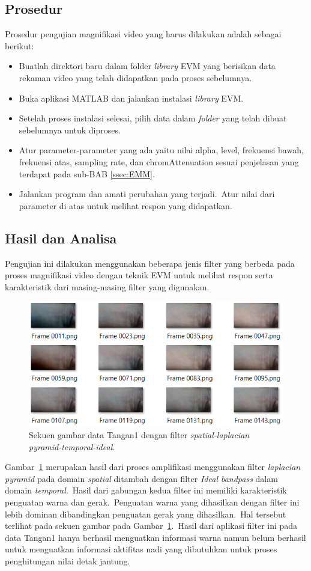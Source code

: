 \subsection{Prosedur}
Prosedur pengujian magnifikasi video yang harus dilakukan adalah sebagai berikut:
\begin{itemize}
\item Buatlah direktori baru dalam folder \textit{library} EVM yang berisikan data rekaman video yang telah didapatkan pada proses sebelumnya.
\item Buka aplikasi MATLAB dan jalankan instalasi \textit{library} EVM.~
\item Setelah proses instalasi selesai, pilih data dalam \textit{folder} yang telah dibuat sebelumnya untuk diproses.
\item Atur parameter-parameter yang ada yaitu nilai alpha, level, frekuensi bawah, frekuensi atas, sampling rate, dan chromAttenuation sesuai penjelasan yang terdapat pada sub-BAB \ref{ssec:EMM}.~
\item Jalankan program dan amati perubahan yang terjadi.~Atur nilai dari parameter di atas untuk melihat respon yang didapatkan.
\end{itemize}

\subsection{Hasil dan Analisa}
Pengujian ini dilakukan menggunakan beberapa jenis filter yang berbeda pada proses magnifikasi video dengan teknik EVM untuk melihat respon serta karakteristik dari masing-masing filter yang digunakan.
\newpage
\begin{figure}[ht]
	\vspace{0.5em}
	\centering
	\includegraphics[width=\textwidth,height=0.4\linewidth]{data-tangan1-ideal}
	\caption{Sekuen gambar data Tangan1 dengan filter \textit{spatial-laplacian pyramid-temporal-ideal}.}
	\label{fig:sekuen-tangan1}   
\end{figure}
Gambar~\ref{fig:sekuen-tangan1} merupakan hasil dari proses amplifikasi menggunakan filter \textit{laplacian pyramid} pada domain \textit{spatial} ditambah dengan filter \textit{Ideal bandpass} dalam domain \textit{temporal}.~Hasil dari gabungan kedua filter ini memiliki karakteristik penguatan warna dan gerak.~Penguatan warna yang dihasilkan dengan filter ini lebih dominan dibandingkan penguatan gerak yang dihasilkan.~Hal tersebut terlihat pada sekuen gambar pada Gambar~\ref{fig:sekuen-tangan1}.~Hasil dari aplikasi filter ini pada data Tangan1 hanya berhasil menguatkan informasi warna namun belum berhasil untuk menguatkan informasi aktifitas nadi yang dibutuhkan untuk proses penghitungan nilai detak jantung.

